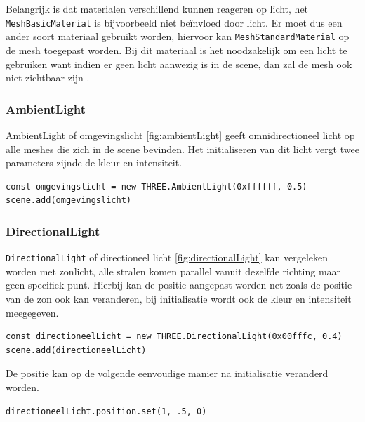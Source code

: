 Belangrijk is dat materialen verschillend kunnen reageren op licht, het \newline \texttt{MeshBasicMaterial} is bijvoorbeeld niet beïnvloed door licht. Er moet dus een ander soort materiaal gebruikt worden, hiervoor kan \texttt{MeshStandardMaterial} op de mesh toegepast worden. Bij dit materiaal is het noodzakelijk om een licht te gebruiken want indien er geen licht aanwezig is in de scene, dan zal de mesh ook niet zichtbaar zijn \autocite{Simon2023}.

\subsubsection{AmbientLight}

AmbientLight of omgevingslicht \ref{fig:ambientLight}  geeft omnidirectioneel licht op alle meshes die zich in de scene bevinden. Het initialiseren van dit licht vergt twee parameters zijnde de kleur en intensiteit.

\begin{lstlisting}
const omgevingslicht = new THREE.AmbientLight(0xffffff, 0.5)
scene.add(omgevingslicht)
\end{lstlisting}

\subsubsection{DirectionalLight}

\texttt{DirectionalLight} of directioneel licht \ref{fig:directionalLight} kan vergeleken worden met zonlicht, alle stralen komen parallel vanuit dezelfde richting maar geen specifiek punt. Hierbij kan de positie aangepast worden net zoals de positie van de zon ook kan veranderen, bij initialisatie wordt ook de kleur en intensiteit meegegeven.

\begin{lstlisting}
const directioneelLicht = new THREE.DirectionalLight(0x00fffc, 0.4)
scene.add(directioneelLicht)
\end{lstlisting}

De positie kan op de volgende eenvoudige manier na initialisatie veranderd worden.

\begin{lstlisting}
directioneelLicht.position.set(1, .5, 0)
\end{lstlisting}

